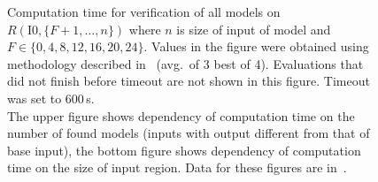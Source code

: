 \begin{figure}[p]
\begin{tikzpicture}[scale=1.2]
    \end{tikzpicture}
    \caption[Computation time of verification of all models based on fixed bits]{%
    Computation time for verification of all models on $R(\text{I0}, \{F+1,\ldots,n\})$
    where $n$ is size of input of model and $F \in \{0,4,8,12,16,20,24\}$.
    Values in the figure were obtained using methodology described in~
    (avg.\ of 3 best of 4). Evaluations that did not finish before timeout are not shown
    in this figure. Timeout was set to 600\,s.\\
    The upper figure shows dependency of computation time on the number of found models
    (inputs with output different from that of base input),
    the bottom figure shows dependency of computation time on the size of input region.
    Data for these figures are in~.
    }\label{fig:eval_fixed_big}%
\end{figure}

